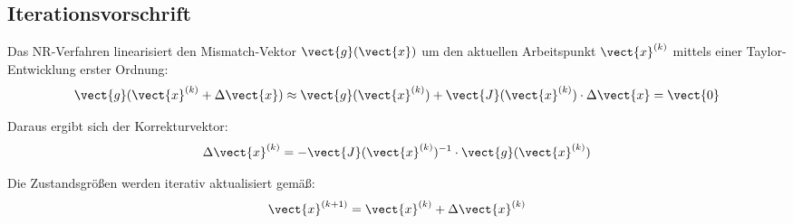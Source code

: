 %

\subsection{Iterationsvorschrift}
\label{subsec:nr_iteration}

Das NR-Verfahren linearisiert den Mismatch-Vektor $\vect{g}(\vect{x})$ um den aktuellen Arbeitspunkt $\vect{x}^{(k)}$ mittels einer Taylor-Entwicklung erster Ordnung:
\begin{equation}
	\vect{g}(\vect{x}^{(k)} + \Delta \vect{x}) \approx \vect{g}(\vect{x}^{(k)}) + \vect{J}(\vect{x}^{(k)}) \cdot \Delta \vect{x} = \vect{0}
	\label{eq:nr_taylor}
\end{equation}

Daraus ergibt sich der Korrekturvektor:
\begin{equation}
	\Delta \vect{x}^{(k)} = -\vect{J}(\vect{x}^{(k)})^{-1} \cdot \vect{g}(\vect{x}^{(k)})
	\label{eq:newton_richtung}
\end{equation}

Die Zustandsgrößen werden iterativ aktualisiert gemäß:
\begin{equation}
	\vect{x}^{(k+1)} = \vect{x}^{(k)} + \Delta \vect{x}^{(k)}
	\label{eq:nr_update}
\end{equation}
%

